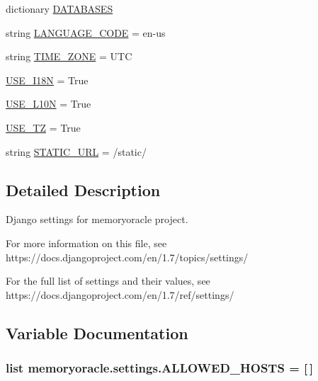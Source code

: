 \begin{DoxyCompactItemize}
dictionary \hyperlink{namespacememoryoracle_1_1settings_acb2be5a1881ee462bf8301b2e47754f4}{D\+A\+T\+A\+B\+A\+S\+E\+S}
\item 
string \hyperlink{namespacememoryoracle_1_1settings_aa38fcebeba95ab0de566b589068a6aea}{L\+A\+N\+G\+U\+A\+G\+E\+\_\+\+C\+O\+D\+E} = \textquotesingle{}en-\/us\textquotesingle{}
\item 
string \hyperlink{namespacememoryoracle_1_1settings_a71b87e5d3e6de18ad0701a27d643558a}{T\+I\+M\+E\+\_\+\+Z\+O\+N\+E} = \textquotesingle{}U\+T\+C\textquotesingle{}
\item 
\hyperlink{namespacememoryoracle_1_1settings_a8788c114be7d1e83fe9f03e1a9bc4f4d}{U\+S\+E\+\_\+\+I18\+N} = True
\item 
\hyperlink{namespacememoryoracle_1_1settings_a59082cdfd1b4c6cde674a08c04015557}{U\+S\+E\+\_\+\+L10\+N} = True
\item 
\hyperlink{namespacememoryoracle_1_1settings_a4fa7a9ff610d0fe7965cd9f795d99aca}{U\+S\+E\+\_\+\+T\+Z} = True
\item 
string \hyperlink{namespacememoryoracle_1_1settings_acb558760188386601f245688e233bcd8}{S\+T\+A\+T\+I\+C\+\_\+\+U\+R\+L} = \textquotesingle{}/static/\textquotesingle{}
\end{DoxyCompactItemize}


\subsection{Detailed Description}
\begin{DoxyVerb}Django settings for memoryoracle project.

For more information on this file, see
https://docs.djangoproject.com/en/1.7/topics/settings/

For the full list of settings and their values, see
https://docs.djangoproject.com/en/1.7/ref/settings/
\end{DoxyVerb}
 

\subsection{Variable Documentation}
\hypertarget{namespacememoryoracle_1_1settings_ad8ebc3cca1f2eb2beaab000158d3a26c}{}
\subsubsection[{A\+L\+L\+O\+W\+E\+D\+\_\+\+H\+O\+S\+T\+S}]{\setlength{\rightskip}{0pt plus 5cm}list memoryoracle.\+settings.\+A\+L\+L\+O\+W\+E\+D\+\_\+\+H\+O\+S\+T\+S = \mbox{[}$\,$\mbox{]}}\label{namespacememoryoracle_1_1settings_ad8ebc3cca1f2eb2beaab000158d3a26c}


